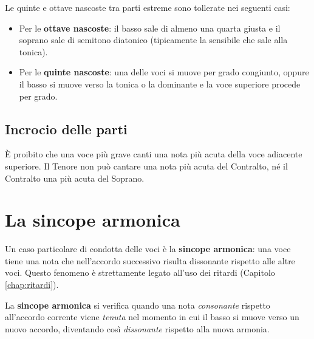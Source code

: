 \begin{regola}
	\label{reg:eccezioni_nascoste}
	Le quinte e ottave nascoste tra parti estreme sono tollerate nei seguenti casi:
	\begin{itemize}
		\item Per le \textbf{ottave nascoste}: il basso sale di almeno una quarta giusta e il soprano sale di semitono diatonico (tipicamente la sensibile che sale alla tonica).
		\item Per le \textbf{quinte nascoste}: una delle voci si muove per grado congiunto, oppure il basso si muove verso la tonica o la dominante e la voce superiore procede per grado.
	\end{itemize}
\end{regola}

\subsection{Incrocio delle parti}

\begin{errore}
	\label{err:incrocio}
	È proibito che una voce più grave canti una nota più acuta della voce adiacente superiore. Il Tenore non può cantare una nota più acuta del Contralto, né il Contralto una più acuta del Soprano.
\end{errore}

\section{La sincope armonica}
\label{sec:sincope_armonica}

Un caso particolare di condotta delle voci è la \textbf{sincope armonica}: una voce tiene una nota che nell'accordo successivo risulta dissonante rispetto alle altre voci. Questo fenomeno è strettamente legato all'uso dei ritardi (Capitolo \ref{chap:ritardi}).

\begin{definizione}
	\label{def:sincope_armonica}
	La \textbf{sincope armonica} si verifica quando una nota \textit{consonante} rispetto all'accordo corrente viene \textit{tenuta} nel momento in cui il basso si muove verso un nuovo accordo, diventando così \textit{dissonante} rispetto alla nuova armonia.
\end{definizione}

